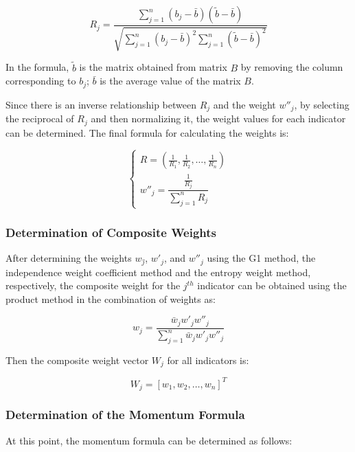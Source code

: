 \documentclass[12pt]{article}  %
\begin{document}
\begin{equation}
	R_j=\frac{\sum_{j=1}^n (b_j-\bar{b})(\tilde{b}-\bar{b})}{\sqrt{\sum_{j=1}^n(b_j-\bar{b})^2\sum_{j=1}^n(\tilde{b}-\bar{b})^2}}
\end{equation}

In the formula, \(\tilde{b}\) is the matrix obtained from matrix \(B\) by removing the column corresponding to \(b_j\); \(\bar{b}\) is the average value of the matrix \(B\).

Since there is an inverse relationship between \(R_j\) and the weight \(w''_j\), by selecting the reciprocal of \(R_j\) and then normalizing it, the weight values for each indicator can be determined. The final formula for calculating the weights is:

\begin{equation}
	\begin{cases}
		R=\left(\frac{1}{R_1},\frac{1}{R_2},\ldots,\frac{1}{R_n}\right) \\[8pt]
		w''_j=\dfrac{\frac{1}{R_j}}{\sum_{j=1}^nR_j}
	\end{cases}
\end{equation}

\subsubsection{Determination of Composite Weights}
After determining the weights \(w \bar{_j}\), \(w'_j\), and \(w''_j\) using the G1 method, the independence weight coefficient method and the entropy weight method, respectively, the composite weight for the \(j^{th}\) indicator can be obtained using the product method in the combination of weights as:

\begin{equation}
	w_j=\frac{\bar{w}_jw'_jw''_j}{\sum_{j=1}^n\bar{w}_jw'_jw''_j}
\end{equation}

Then the composite weight vector \(W_j\) for all indicators is:

\begin{equation}
	W_j=[w_1,w_2,\ldots,w_n]^T
\end{equation}

\subsubsection{Determination of the Momentum Formula}

At this point, the momentum formula can be determined as follows:
\end{document}
